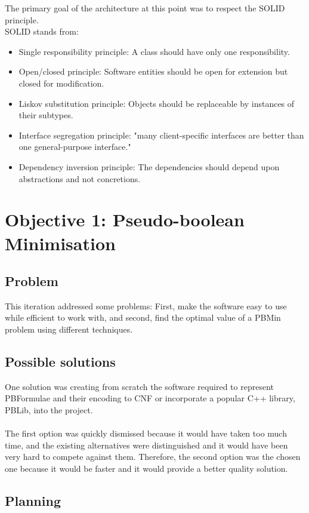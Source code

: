 The primary goal of the architecture at this point was to respect the SOLID principle.  \\
SOLID \cite{Martin} stands from: 
\begin{itemize}
	\item Single responsibility principle: A class should have only one responsibility.  
	\item Open/closed principle: Software entities should be open for extension but closed for modification. 
	\item Liskov substitution principle: Objects should be replaceable by instances of their subtypes.  
	\item Interface segregation principle: "many client-specific interfaces are better than one general-purpose interface."
	\item Dependency inversion principle: The dependencies should depend upon abstractions and not concretions.
\end{itemize}

\section{Objective 1: Pseudo-boolean Minimisation}

\subsection{Problem}
This iteration addressed some problems: First, make the software easy to use while efficient to work with, and second, find the optimal value of a PBMin problem using different techniques.  

\subsection{Possible solutions}
One solution was creating from scratch the software required to represent PBFormulae and their encoding to CNF or incorporate a popular C++ library, PBLib, into the project. \\\\
The first option was quickly dismissed because it would have taken too much time, and the existing alternatives were distinguished and it would have been very hard to compete against them. Therefore, the second option was the chosen one because it would be faster and it would provide a better quality solution. 


\subsection{Planning}

